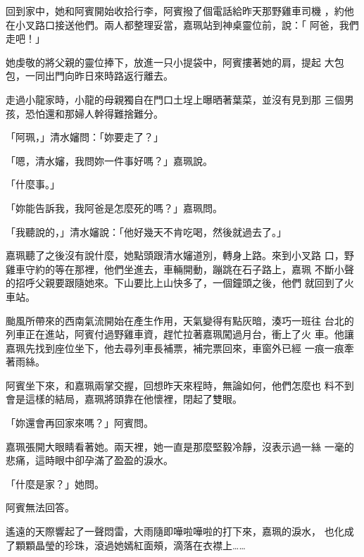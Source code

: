 回到家中，她和阿賓開始收拾行李，阿賓撥了個電話給昨天那野雞車司機
，約他在小叉路口接送他們。兩人都整理妥當，嘉珮站到神桌靈位前，說：「
阿爸，我們走吧！」

她虔敬的將父親的靈位捧下，放進一只小提袋中，阿賓摟著她的肩，提起
大包包，一同出門向昨日來時路返行離去。

走過小龍家時，小龍的母親獨自在門口土埕上曝晒著葉菜，並沒有見到那
三個男孩，恐怕還和那婦人幹得難捨難分。

「阿珮，」清水嬸問：「妳要走了？」

「嗯，清水嬸，我問妳一件事好嗎？」嘉珮說。

「什麼事。」

「妳能告訴我，我阿爸是怎麼死的嗎？」嘉珮問。

「我聽說的，」清水嬸說：「他好幾天不肯吃喝，然後就過去了。」

嘉珮聽了之後沒有說什麼，她點頭跟清水嬸道別，轉身上路。來到小叉路
口，野雞車守約的等在那裡，他們坐進去，車輛開動，蹦跳在石子路上，嘉珮
不斷小聲的招呼父親要跟隨她來。下山要比上山快多了，一個鐘頭之後，他們
就回到了火車站。

颱風所帶來的西南氣流開始在產生作用，天氣變得有點灰暗，湊巧一班往
台北的列車正在進站，阿賓付過野雞車資，趕忙拉著嘉珮闖過月台，衝上了火
車。他讓嘉珮先找到座位坐下，他去尋列車長補票，補完票回來，車窗外已經
一痕一痕牽著雨絲。

阿賓坐下來，和嘉珮兩掌交握，回想昨天來程時，無論如何，他們怎麼也
料不到會是這樣的結局，嘉珮將頭靠在他懷裡，閉起了雙眼。

「妳還會再回家來嗎？」阿賓問。

嘉珮張開大眼睛看著她。兩天裡，她一直是那麼堅毅冷靜，沒表示過一絲
一毫的悲痛，這時眼中卻孕滿了盈盈的淚水。

「什麼是家？」她問。

阿賓無法回答。

遙遠的天際響起了一聲悶雷，大雨隨即嘩啦嘩啦的打下來，嘉珮的淚水，
也化成了顆顆晶瑩的珍珠，滾過她嫣紅面頰，滴落在衣襟上……










